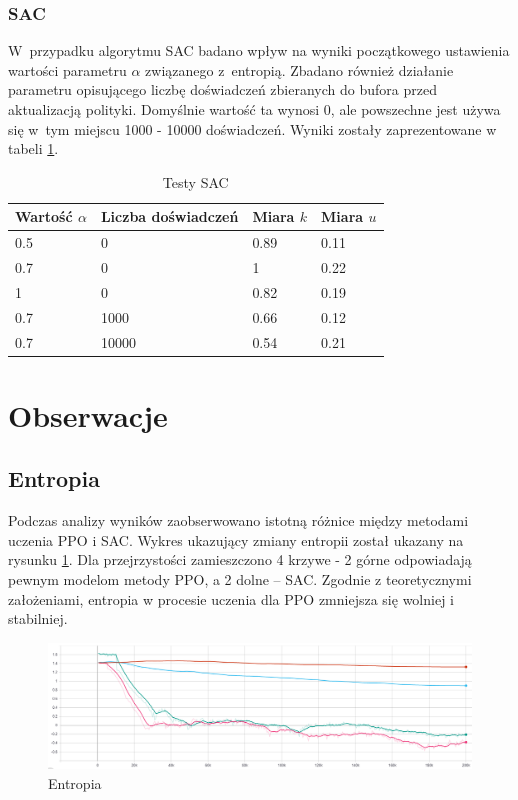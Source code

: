 \documentclass[a4paper,12pt]{article}
\let\oldsection\section
\renewcommand\section{\clearpage\oldsection}
\begin{document}
\subsubsection{SAC}
W~przypadku algorytmu SAC badano wpływ na wyniki początkowego ustawienia wartości parametru $\alpha$ związanego z~entropią. Zbadano również działanie parametru opisującego liczbę doświadczeń zbieranych do bufora przed aktualizacją polityki. Domyślnie wartość ta wynosi 0, ale powszechne jest używa się w~tym miejscu 1000 - 10000 doświadczeń. Wyniki zostały zaprezentowane w tabeli \ref{tab:sac}.

\begin{table}[H]
	\centering
	\smallskip
	\begin{tabular}{|l|l|l|l|}
		\hline
		Wartość $\alpha$ & Liczba doświadczeń & Miara $k$ & Miara $u$ \\
		\hline
		0.5 & 0 & 0.89 & 0.11 \\		
		0.7 & 0 & 1 & 0.22 \\		
		1 & 0 & 0.82 & 0.19 \\		
		0.7 & 1000 & 0.66 & 0.12 \\	
		0.7 & 10000 & 0.54 & 0.21 \\\hline
	\end{tabular}
	\caption{Testy SAC}
	\label{tab:sac}
\end{table}


\section{Obserwacje}

\subsection{Entropia}
Podczas analizy wyników zaobserwowano istotną różnice między metodami uczenia PPO i SAC. Wykres ukazujący zmiany entropii został ukazany na rysunku \ref{pic:entropy}. Dla przejrzystości zamieszczono 4 krzywe - 2 górne odpowiadają pewnym modelom metody PPO, a 2 dolne -- SAC. Zgodnie z teoretycznymi założeniami, entropia w procesie uczenia dla PPO zmniejsza się wolniej i stabilniej. 
\begin{figure}[H]
	\centering
	\includegraphics[width=\textwidth]{entropy}
	\caption{Entropia}
	\label{pic:entropy}
\end{figure}
\end{document}
